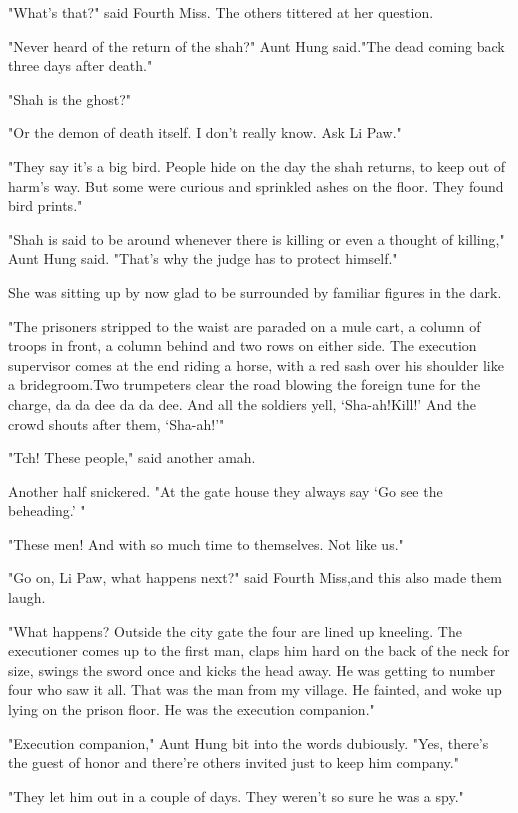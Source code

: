 \par "What's that?" said Fourth Miss. The others tittered at her question.
\par "Never heard of the return of the shah?" Aunt Hung said."The dead coming back three days after death."
\par "Shah is the ghost?"
\par "Or the demon of death itself. I don't really know. Ask Li Paw."
\par "They say it's a big bird. People hide on the day the shah returns, to keep out of harm's way. But some were curious and sprinkled ashes on the floor. They found bird prints."
\par "Shah is said to be around whenever there is killing or even a thought of killing," Aunt Hung said. "That's why the judge has to protect himself."
\par She was sitting up by now glad to be surrounded by familiar figures in the dark.
\par "The prisoners stripped to the waist are paraded on a mule cart, a column of troops in front, a column behind and two rows on either side. The execution supervisor comes at the end riding a horse, with a red sash over his shoulder like a bridegroom.Two trumpeters clear the road blowing the foreign tune for the charge, da da dee da da dee. And all the soldiers yell, ‘Sha-ah!Kill!' And the crowd shouts after them, ‘Sha-ah!'"
\par "Tch! These people," said another amah.
\par Another half snickered. "At the gate house they always say ‘Go see the beheading.' "
\par "These men! And with so much time to themselves. Not like us."
\par "Go on, Li Paw, what happens next?" said Fourth Miss,and this also made them laugh.
\par "What happens? Outside the city gate the four are lined up kneeling. The executioner comes up to the first man, claps him hard on the back of the neck for size, swings the sword once and kicks the head away. He was getting to number four who saw it all. That was the man from my village. He fainted, and woke up lying on the prison floor. He was the execution companion."
\par "Execution companion," Aunt Hung bit into the words dubiously. "Yes, there's the guest of honor and there're others invited just to keep him company."
\par "They let him out in a couple of days. They weren't so sure he was a spy."
